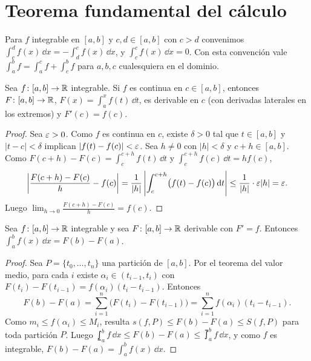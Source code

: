 \section{Teorema fundamental del cálculo}

Para \(f\) integrable en \([a, b]\) y \(c, d \in [a, b]\) con \(c > d\) convenimos \(\int_c^d f(x) \,\dd x = -\int_d^c f(x) \,\dd x\), y \(\int_c^c f(x) \,\dd x = 0\). Con esta convención vale \(\int_a^b f = \int_a^c f + \int_c^b f\) para \(a, b, c\) cualesquiera en el dominio.

\begin{theorem}
  Sea \(f\colon [a, b] \to \mathbb{R}\) integrable. Si \(f\) es continua en \(c \in [a, b]\), entonces \(F\colon [a, b] \to \mathbb{R}\), \(F(x) = \int_a^x f(t) \,\dd t\), es derivable en \(c\) (con derivadas laterales en los extremos) y \(F'(c) = f(c)\).
\end{theorem}

\begin{proof}
  Sea \(\varepsilon > 0\). Como \(f\) es continua en \(c\), existe \(\delta > 0\) tal que \(t \in [a, b]\) y \(|t - c| < \delta\) implican \(|f(t) - f(c)| < \varepsilon\). Sea \(h \neq 0\) con \(|h| < \delta\) y \(c + h \in [a, b]\). Como \(F(c + h) - F(c) = \int_c^{c+h} f(t) \,\dd t\) y \(\int_c^{c+h} f(c) \,\dd t = h f(c)\),
  \[
    \left| \frac{F(c + h) - F(c)}{h} - f(c) \right| = \frac{1}{|h|} \left| \int_c^{c+h} \bigl( f(t) - f(c) \bigr) \mathop{}\!\mathrm{d} t \right| \leq \frac{1}{|h|} \cdot \varepsilon |h| = \varepsilon.
  \]
  Luego \(\lim_{h \to 0} \frac{F(c + h) - F(c)}{h} = f(c)\).
\end{proof}

\begin{corollary}
  Sea \(f\colon [a, b] \to \mathbb{R}\) integrable y sea \(F\colon [a, b] \to \mathbb{R}\) derivable con \(F' = f\). Entonces \(\int_a^b f(x) \,\dd x = F(b) - F(a)\).
\end{corollary}

\begin{proof}
  Sea \(P = \{ t_0, \dots, t_n \}\) una partición de \([a, b]\). Por el teorema del valor medio, para cada \(i\) existe \(\alpha_i \in (t_{i-1}, t_i)\) con \(F(t_i) - F(t_{i-1}) = f(\alpha_i)(t_i - t_{i-1})\). Entonces
  \[
    F(b) - F(a) = \sum_{i=1}^{n} \bigl( F(t_i) - F(t_{i-1}) \bigr) = \sum_{i=1}^{n} f(\alpha_i)(t_i - t_{i-1}).
  \]
  Como \(m_i \leq f(\alpha_i) \leq M_i\), resulta \(s(f, P) \leq F(b) - F(a) \leq S(f, P)\) para toda partición \(P\). Luego \(\lowint_a^b f \,\dd x \leq F(b) - F(a) \leq \upint_a^b f \,\dd x\), y como \(f\) es integrable, \(F(b) - F(a) = \int_a^b f(x) \,\dd x\).
\end{proof}

